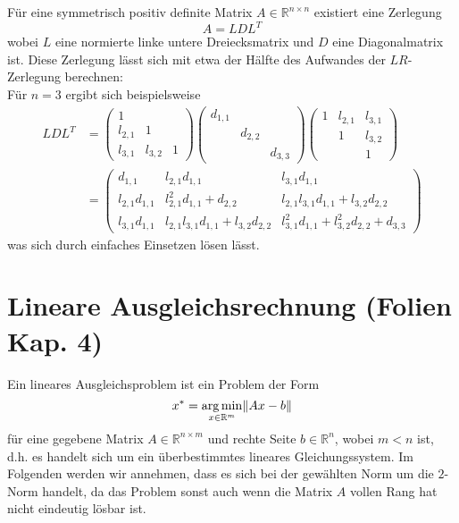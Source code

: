 \documentclass[a4paper,parskip=half*,DIV=7,fontsize=11pt]{scrartcl}
\DeclarePairedDelimiter\norm{\lVert}{\rVert}
\DeclareMathOperator*\argmin{arg\,min}
\begin{document}
Für eine symmetrisch positiv definite Matrix $A \in \mathbb{R}^{n \times n}$ existiert eine Zerlegung
\[A = LDL^T\]
wobei $L$ eine normierte linke untere Dreiecksmatrix und $D$ eine Diagonalmatrix ist. Diese Zerlegung lässt sich mit etwa der Hälfte des Aufwandes der $LR$-Zerlegung berechnen:	\\
Für $n = 3$ ergibt sich beispielsweise
\begin{align*}
LDL^T &= \begin{pmatrix}
	1	\\
    l_{2,1}	&	1	\\
    l_{3,1}	&	l_{3,2}	&	1
\end{pmatrix} \begin{pmatrix}
	d_{1,1}	\\
    	&	d_{2,2}	\\
        &	&	d_{3,3}
\end{pmatrix} \begin{pmatrix}
	1	&	l_{2,1}	&	l_{3,1}	\\
    	&	1	&	l_{3,2}	\\
    	&	&	1
\end{pmatrix}	\\
&= \begin{pmatrix}
	d_{1,1}	&	l_{2,1}d_{1,1}	&	l_{3,1}d_{1,1}	\\
    l_{2,1}d_{1,1}	&	l_{2,1}^2d_{1,1} + d_{2,2}	&	l_{2,1}l_{3,1}d_{1,1}+l_{3,2}d_{2,2}	\\
    l_{3,1}d_{1,1}	&	l_{2,1}l_{3,1}d_{1,1}+l_{3,2}d_{2,2}	&	l_{3,1}^2d_{1,1} + l_{3,2}^2d_{2,2} + d_{3,3}
\end{pmatrix}
\end{align*}
was sich durch einfaches Einsetzen lösen lässt.


\section{Lineare Ausgleichsrechnung (Folien Kap. 4)}

Ein lineares Ausgleichsproblem ist ein Problem der Form
\[x^\ast = \argmin_{x \in \mathbb{R}^{m}} \norm*{Ax-b}\]
für eine gegebene Matrix $A \in \mathbb{R}^{n \times m}$ und rechte Seite $b \in \mathbb{R}^n$, wobei $m < n$ ist, d.h. es handelt sich um ein überbestimmtes lineares Gleichungssystem. Im Folgenden werden wir annehmen, dass es sich bei der gewählten Norm um die $2$-Norm handelt, da das Problem sonst auch wenn die Matrix $A$ vollen Rang hat nicht eindeutig lösbar ist.
\end{document}
